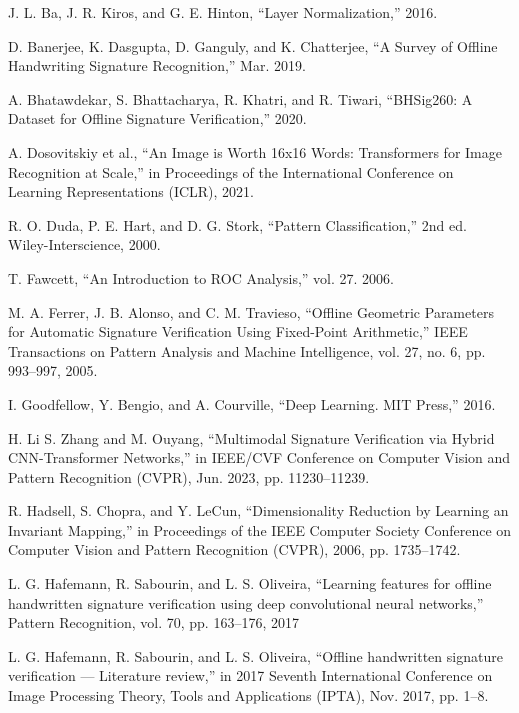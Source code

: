




  \begin{thebibliography}{10}

J. L. Ba, J. R. Kiros, and G. E. Hinton, ``Layer Normalization,''
2016.

D. Banerjee, K. Dasgupta, D. Ganguly, and K. Chatterjee, ``A Survey of Offline Handwriting Signature Recognition,''
Mar. 2019.

A. Bhatawdekar, S. Bhattacharya, R. Khatri, and R. Tiwari, ``BHSig260: A Dataset for Offline Signature Verification,''
2020.

A. Dosovitskiy et al., ``An Image is Worth 16x16 Words: Transformers for Image Recognition at Scale,'' in Proceedings of the International Conference on Learning Representations (ICLR),
2021.

R. O. Duda, P. E. Hart, and D. G. Stork, ``Pattern Classification,'' 2nd ed. Wiley-Interscience,
2000.

T. Fawcett, ``An Introduction to ROC Analysis,'' vol. 27.
2006.

M. A. Ferrer, J. B. Alonso, and C. M. Travieso, ``Offline Geometric Parameters for Automatic Signature Verification Using Fixed-Point Arithmetic,'' IEEE Transactions on Pattern Analysis and Machine Intelligence, vol. 27, no. 6, pp. 993--997,
2005.

I. Goodfellow, Y. Bengio, and A. Courville, ``Deep Learning. MIT Press,''
2016.

H. Li S. Zhang and M. Ouyang, ``Multimodal Signature Verification via Hybrid CNN-Transformer Networks,'' in IEEE/CVF Conference on Computer Vision and Pattern Recognition (CVPR),
Jun. 2023, pp. 11230--11239.

R. Hadsell, S. Chopra, and Y. LeCun, ``Dimensionality Reduction by Learning an Invariant Mapping,'' in Proceedings of the IEEE Computer Society Conference on Computer Vision and Pattern Recognition (CVPR),
2006, pp. 1735--1742.

L. G. Hafemann, R. Sabourin, and L. S. Oliveira, ``Learning features for offline handwritten signature verification using deep convolutional neural networks,'' Pattern Recognition, vol. 70, pp. 163--176,
2017

L. G. Hafemann, R. Sabourin, and L. S. Oliveira, ``Offline handwritten signature verification — Literature review,'' in 2017 Seventh International Conference on Image Processing Theory, Tools and Applications (IPTA),
Nov. 2017, pp. 1--8.


\end{thebibliography}
